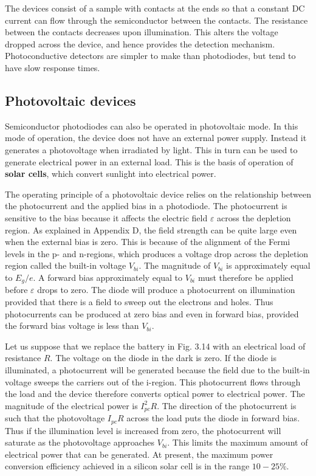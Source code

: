 \documentclass[12pt]{book}
\begin{document}
The devices consist of a sample with contacts at the ends so that a constant DC current can flow through the semiconductor between the contacts. The resistance between the contacts decreases upon illumination. This alters the voltage dropped across the device, and hence provides the detection mechanism. Photoconductive detectors are simpler to make than photodiodes, but tend to have slow response times.

\subsection{Photovoltaic devices}

Semiconductor photodiodes can also be operated in photovoltaic mode. In this mode of operation, the device does not have an external power supply. Instead it generates a photovoltage when irradiated by light. This in turn can be used to generate electrical power in an external load. This is the basis of operation of \textbf{solar cells}, which convert sunlight into electrical power.

The operating principle of a photovoltaic device relies on the relationship between the photocurrent and the applied bias in a photodiode. The photocurrent is sensitive to the bias because it affects the electric field $\varepsilon$ across the depletion region. As explained in Appendix D, the field strength can be quite large even when the external bias is zero. This is because of the alignment of the Fermi levels in the p- and n-regions, which produces a voltage drop across the depletion region called the built-in voltage $V_{bi}$. The magnitude of $V_{bi}$ is approximately equal to $E_g/e$. A forward bias approximately equal to $V_{bi}$ must therefore be applied before $\varepsilon$ drops to zero. The diode will produce a photocurrent on illumination provided that there is a field to sweep out the electrons and holes. Thus photocurrents can be produced at zero bias and even in forward bias, provided the forward bias voltage is less than $V_{bi}$.

Let us suppose that we replace the battery in Fig. 3.14 with an electrical load of resistance $R$. The voltage on the diode in the dark is zero. If the diode is illuminated, a photocurrent will be generated because the field due to the built-in voltage sweeps the carriers out of the i-region. This photocurrent flows through the load and the device therefore converts optical power to electrical  power. The magnitude of the electrical power is $I_{pc}^2R$. The direction of the photocurrent is such that the photovoltage $I_{pc}R$ across the load puts the diode in forward bias. Thus if the illumination level is increased from zero, the photocurrent will saturate as the photovoltage approaches $V_{bi}$. This limits the maximum amount of electrical power that can be generated. At present, the maximum power conversion efficiency achieved in a silicon solar cell is in the range $10-25\%$.
\end{document}
